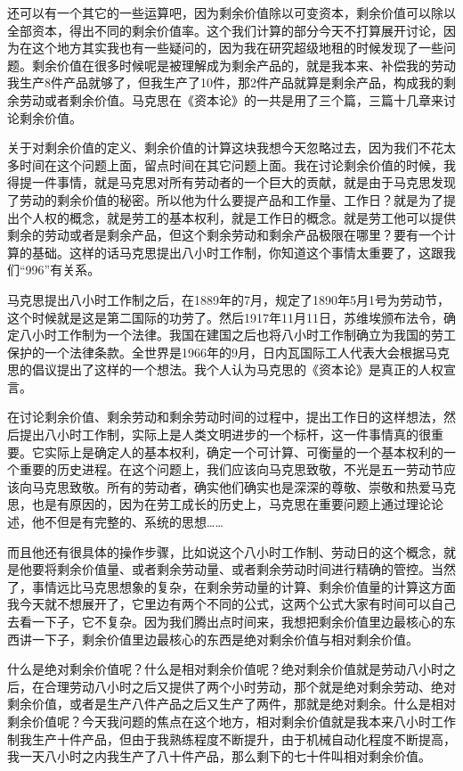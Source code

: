 \documentclass[UTF8, 12pt, a4paper]{ctexrep}
\begin{document}
还可以有一个其它的一些运算吧，因为剩余价值除以可变资本，剩余价值可以除以全部资本，得出不同的剩余价值率。这个我们计算的部分今天不打算展开讨论，因为在这个地方其实我也有一些疑问的，因为我在研究超级地租的时候发现了一些问题。剩余价值在很多时候呢是被理解成为剩余产品的，就是我本来、补偿我的劳动我生产8件产品就够了，但我生产了10件，那2件产品就算是剩余产品，构成我的剩余劳动或者剩余价值。马克思在《资本论》的一共是用了三个篇，三篇十几章来讨论剩余价值。

关于对剩余价值的定义、剩余价值的计算这块我想今天忽略过去，因为我们不花太多时间在这个问题上面，留点时间在其它问题上面。我在讨论剩余价值的时候，我得提一件事情，就是马克思对所有劳动者的一个巨大的贡献，就是由于马克思发现了劳动的剩余价值的秘密。所以他为什么要提产品和工作量、工作日？就是为了提出个人权的概念，就是劳工的基本权利，就是工作日的概念。就是劳工他可以提供剩余的劳动或者是剩余产品，但这个剩余劳动和剩余产品极限在哪里？要有一个计算的基础。这样的话马克思提出八小时工作制，你知道这个事情太重要了，这跟我们“996”有关系。

马克思提出八小时工作制之后，在1889年的7月，规定了1890年5月1号为劳动节，这个时候就是这是第二国际的功劳了。然后1917年11月11日，苏维埃颁布法令，确定八小时工作制为一个法律。我国在建国之后也将八小时工作制确立为我国的劳工保护的一个法律条款。全世界是1966年的9月，日内瓦国际工人代表大会根据马克思的倡议提出了这样的一个想法。我个人认为马克思的《资本论》是真正的人权宣言。

在讨论剩余价值、剩余劳动和剩余劳动时间的过程中，提出工作日的这样想法，然后提出八小时工作制，实际上是人类文明进步的一个标杆，这一件事情真的很重要。它实际上是确定人的基本权利，确定一个可计算、可衡量的一个基本权利的一个重要的历史进程。在这个问题上，我们应该向马克思致敬，不光是五一劳动节应该向马克思致敬。所有的劳动者，确实他们确实也是深深的尊敬、崇敬和热爱马克思，也是有原因的，因为在劳工成长的历史上，马克思在重要问题上通过理论论述，他不但是有完整的、系统的思想……

而且他还有很具体的操作步骤，比如说这个八小时工作制、劳动日的这个概念，就是他要将剩余价值量、或者剩余劳动量、或者剩余劳动时间进行精确的管控。当然了，事情远比马克思想象的复杂，在剩余劳动量的计算、剩余价值量的计算这方面我今天就不想展开了，它里边有两个不同的公式，这两个公式大家有时间可以自己去看一下子，它不复杂。因为我们腾出点时间来，我想把剩余价值里边最核心的东西讲一下子，剩余价值里边最核心的东西是绝对剩余价值与相对剩余价值。

什么是绝对剩余价值呢？什么是相对剩余价值呢？绝对剩余价值就是劳动八小时之后，在合理劳动八小时之后又提供了两个小时劳动，那个就是绝对剩余劳动、绝对剩余价值，或者是生产八件产品之后又生产了两件，那就是绝对剩余。什么是相对剩余价值呢？今天我问题的焦点在这个地方，相对剩余价值就是我本来八小时工作制我生产十件产品，但由于我熟练程度不断提升，由于机械自动化程度不断提高，我一天八小时之内我生产了八十件产品，那么剩下的七十件叫相对剩余价值。
\end{document}
